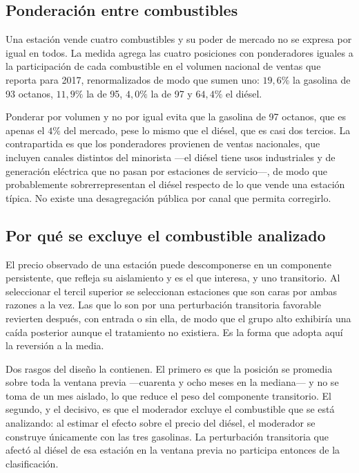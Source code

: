\subsection{Ponderación entre combustibles}

Una estación vende cuatro combustibles y su poder de mercado no se expresa por
igual en todos. La medida agrega las cuatro posiciones con ponderadores iguales
a la participación de cada combustible en el volumen nacional de ventas que
reporta \textcite{FNE2025informe} para 2017, renormalizados de modo que sumen
uno: $19{,}6\%$ la gasolina de 93 octanos, $11{,}9\%$ la de 95, $4{,}0\%$ la de
97 y $64{,}4\%$ el diésel.

Ponderar por volumen y no por igual evita que la gasolina de 97 octanos, que es
apenas el $4\%$ del mercado, pese lo mismo que el diésel, que es casi dos
tercios. La contrapartida es que los ponderadores provienen de ventas
nacionales, que incluyen canales distintos del minorista —el diésel tiene usos
industriales y de generación eléctrica que no pasan por estaciones de
servicio—, de modo que probablemente sobrerrepresentan el diésel respecto de lo
que vende una estación típica. No existe una desagregación pública por canal que
permita corregirlo.

\subsection{Por qué se excluye el combustible analizado}

El precio observado de una estación puede descomponerse en un componente
persistente, que refleja su aislamiento y es el que interesa, y uno transitorio.
Al seleccionar el tercil superior se seleccionan estaciones que son caras por
ambas razones a la vez. Las que lo son por una perturbación transitoria
favorable revierten después, con entrada o sin ella, de modo que el grupo alto
exhibiría una caída posterior aunque el tratamiento no existiera. Es la forma
que adopta aquí la reversión a la media.

Dos rasgos del diseño la contienen. El primero es que la posición se promedia
sobre toda la ventana previa —cuarenta y ocho meses en la mediana— y no se
toma de un mes aislado, lo que reduce el peso del componente transitorio. El
segundo, y el decisivo, es que el moderador excluye el combustible que se está
analizando: al estimar el efecto sobre el precio del diésel, el moderador se
construye únicamente con las tres gasolinas. La perturbación transitoria que
afectó al diésel de esa estación en la ventana previa no participa entonces de
la clasificación.

